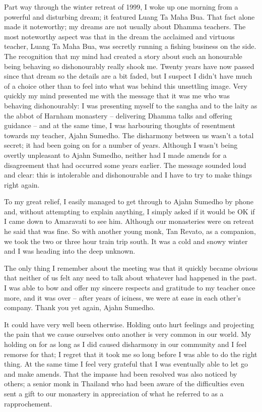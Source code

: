 Part way through the winter retreat of 1999, I woke up one morning from
a powerful and disturbing dream; it featured Luang Ta Maha Bua. That
fact alone made it noteworthy; my dreams are not usually about Dhamma
teachers. The most noteworthy aspect was that in the dream the acclaimed
and virtuous teacher, Luang Ta Maha Bua, was secretly running a fishing
business on the side. The recognition that my mind had created a story
about such an honourable being behaving so dishonourably really shook
me. Twenty years have now passed since that dream so the details are a
bit faded, but I suspect I didn't have much of a choice other than to
feel into what was behind this unsettling image. Very quickly my mind
presented me with the message that it was me who was behaving
dishonourably: I was presenting myself to the sangha and to the laity as
the abbot of Harnham monastery -- delivering Dhamma talks and offering
guidance -- and at the same time, I was harbouring thoughts of
resentment towards my teacher, Ajahn Sumedho. The disharmony between us
wasn't a total secret; it had been going on for a number of years.
Although I wasn't being overtly unpleasant to Ajahn Sumedho, neither had
I made amends for a disagreement that had occurred some years earlier.
The message sounded loud and clear: this is intolerable and
dishonourable and I have to try to make things right again.

To my great relief, I easily managed to get through to Ajahn Sumedho by
phone and, without attempting to explain anything, I simply asked if it
would be OK if I came down to Amaravati to see him. Although our
monasteries were on retreat he said that was fine. So with another young
monk, Tan Revato, as a companion, we took the two or three hour train
trip south. It was a cold and snowy winter and I was heading into the
deep unknown.

The only thing I remember about the meeting was that it quickly became
obvious that neither of us felt any need to talk about whatever had
happened in the past. I was able to bow and offer my sincere respects
and gratitude to my teacher once more, and it was over -- after years of
iciness, we were at ease in each other's company. Thank you yet again,
Ajahn Sumedho.

It could have very well been otherwise. Holding onto hurt feelings and
projecting the pain that we cause ourselves onto another is very common
in our world. My holding on for as long as I did caused disharmony in
our community and I feel remorse for that; I regret that it took me so
long before I was able to do the right thing. At the same time I feel
very grateful that I was eventually able to let go and make amends. That
the impasse had been resolved was also noticed by others; a senior monk
in Thailand who had been aware of the difficulties even sent a gift to
our monastery in appreciation of what he referred to as a rapprochement.

